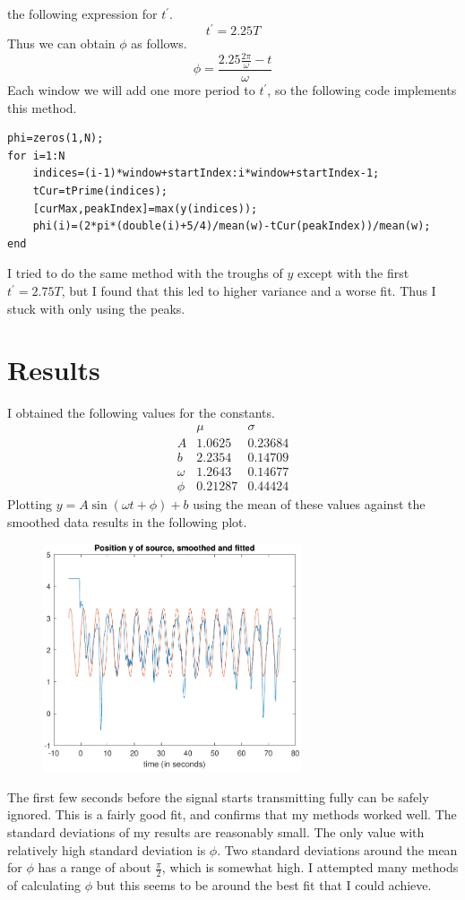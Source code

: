 \documentclass[12pt]{article}
\begin{document}
the following expression for \(t^\prime\).
\[t^\prime = 2.25T\]
Thus we can obtain \(\phi\) as follows.
\[\phi=\frac{2.25\frac{2\pi}{\omega} - t}{\omega}\]
Each window we will add one more period to \(t^\prime\), so the following code implements this method.
\small
\begin{verbatim}
phi=zeros(1,N);
for i=1:N
    indices=(i-1)*window+startIndex:i*window+startIndex-1;
    tCur=tPrime(indices);
    [curMax,peakIndex]=max(y(indices));
    phi(i)=(2*pi*(double(i)+5/4)/mean(w)-tCur(peakIndex))/mean(w);
end
\end{verbatim}
\normalsize
I tried to do the same method with the troughs of \(y\) except with the first \(t^\prime=2.75T\), but I
found that this led to higher variance and a worse fit. Thus I stuck with only using the peaks.

\section{Results}

I obtained the following values for the constants.
\[\begin{array}{c|cc}
    & \mu & \sigma\\
    \hline
    A & 1.0625 & 0.23684\\
    b & 2.2354 & 0.14709\\
    \omega & 1.2643 & 0.14677\\
    \phi & 0.21287 & 0.44424
\end{array}\]
Plotting \(y=A\sin(\omega t + \phi) + b\) using the mean of these values against the smoothed data results
in the following plot.
\begin{figure}[H]
    \begin{center}
        \includegraphics[width=3in]{y-fitted.pdf}
    \end{center}
\end{figure}
The first few seconds before the signal starts transmitting fully can be safely ignored. This is a fairly
good fit, and confirms that my methods worked well. The standard deviations of my results are reasonably small.
The only value with relatively high standard deviation is \(\phi\). Two standard deviations around the mean for \(\phi\)
has a range of about \(\frac{\pi}{2}\), which is somewhat high. I attempted many methods of calculating \(\phi\)
but this seems to be around the best fit that I could achieve.



\end{document}
